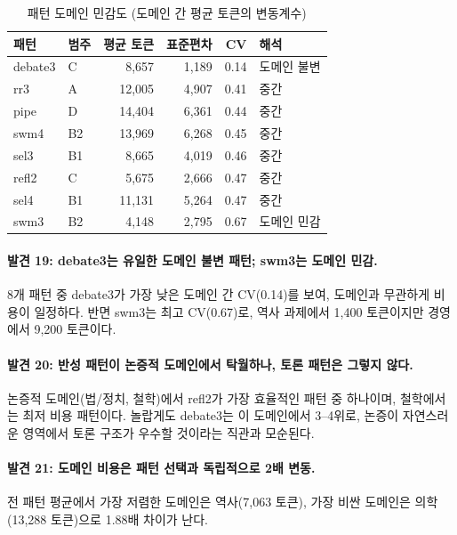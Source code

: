 \begin{table}[H]
\centering
\caption{패턴 도메인 민감도 (도메인 간 평균 토큰의 변동계수)}
\label{tab:domain-cv}
{\small
\begin{tabular}{llrrrl}
\toprule
패턴 & 범주 & 평균 토큰 & 표준편차 & CV & 해석 \\
\midrule
debate3 & C  & 8,657  & 1,189 & 0.14 & 도메인 불변 \\
rr3     & A  & 12,005 & 4,907 & 0.41 & 중간 \\
pipe    & D  & 14,404 & 6,361 & 0.44 & 중간 \\
swm4    & B2 & 13,969 & 6,268 & 0.45 & 중간 \\
sel3    & B1 & 8,665  & 4,019 & 0.46 & 중간 \\
refl2   & C  & 5,675  & 2,666 & 0.47 & 중간 \\
sel4    & B1 & 11,131 & 5,264 & 0.47 & 중간 \\
swm3    & B2 & 4,148  & 2,795 & 0.67 & 도메인 민감 \\
\bottomrule
\end{tabular}
}
\end{table}

\paragraph{발견 19: debate3는 유일한 도메인 불변 패턴; swm3는 도메인 민감.}
8개 패턴 중 debate3가 가장 낮은 도메인 간 CV(0.14)를 보여, 도메인과 무관하게 비용이 일정하다. 반면 swm3는 최고 CV(0.67)로, 역사 과제에서 1,400 토큰이지만 경영에서 9,200 토큰이다.

\paragraph{발견 20: 반성 패턴이 논증적 도메인에서 탁월하나, 토론 패턴은 그렇지 않다.}
논증적 도메인(법/정치, 철학)에서 refl2가 가장 효율적인 패턴 중 하나이며, 철학에서는 최저 비용 패턴이다. 놀랍게도 debate3는 이 도메인에서 3--4위로, 논증이 자연스러운 영역에서 토론 구조가 우수할 것이라는 직관과 모순된다.

\paragraph{발견 21: 도메인 비용은 패턴 선택과 독립적으로 2배 변동.}
전 패턴 평균에서 가장 저렴한 도메인은 역사(7,063 토큰), 가장 비싼 도메인은 의학(13,288 토큰)으로 1.88배 차이가 난다.

